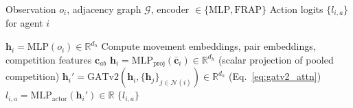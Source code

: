 \begin{algorithm}[ht]
  \caption{First-Generation FGS Forward Pass (MLP or FRAP scalar encoder; GATv2 on scalar embedding)}
  \label{alg:fgs_gen1_forward}
  \begin{algorithmic}[1]
    \Require Observation $o_i$, adjacency graph $\mathcal{G}$, encoder $\in\{\mathrm{MLP}, \mathrm{FRAP}\}$
    \Ensure Action logits $\{l_{i,a}\}$ for agent $i$

      \State $\mathbf{h}_i = \mathrm{MLP}(o_i) \in \mathbb{R}^{d_h}$
    \Else {}
      \State Compute movement embeddings, pair embeddings, competition features $\mathbf{c}_{ab}$
      \State $\mathbf{h}_i = \mathrm{MLP}_{\mathrm{proj}}(\bar{\mathbf{c}}_i) \in \mathbb{R}^{d_h}$ \quad (scalar projection of pooled competition)
    \EndIf
    \State $\mathbf{h}_i' = \mathrm{GATv2}(\mathbf{h}_i, \{\mathbf{h}_j\}_{j\in\mathcal{N}(i)}) \in \mathbb{R}^{d_h}$ \quad (Eq.~\ref{eq:gatv2_attn})
      \State $l_{i,a} = \mathrm{MLP}_{\mathrm{actor}}(\mathbf{h}_i') \in \mathbb{R}$
    \EndFor
    \State \Return $\{l_{i,a}\}$
  \end{algorithmic}
\end{algorithm}


